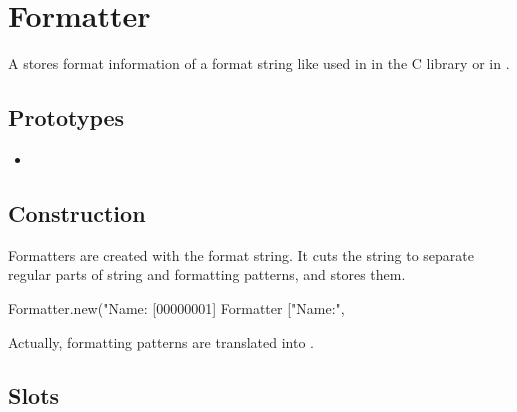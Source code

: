 \section{Formatter}

A  stores format information of a format string like
used in  in the C library or in .

\subsection{Prototypes}

\begin{itemize}
\item {}
\end{itemize}

\subsection{Construction}

Formatters are created with the format string. It cuts the string to
separate regular parts of string and formatting patterns, and stores
them.

\begin{urbiscript}
Formatter.new("Name:%
[00000001] Formatter ["Name:", %
\end{urbiscript}

Actually, formatting patterns are translated into
.

\subsection{Slots}

